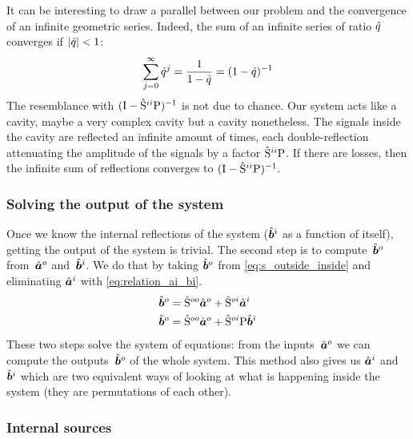 It can be interesting to draw a parallel between our problem and the convergence of an infinite geometric series.
Indeed, the sum of an infinite series of ratio $\hat{q}$ converges if $\abs{\cp{q}} < 1$:
\begin{equation}
    \sum_{j=0}^\infty \hat{q}^j = \frac{1}{1-\hat{q}} = (1-\hat{q})^{-1}
\end{equation}
The resemblance with $(\mathrm{I} - \hat{\mathrm{S}}^{ii}\mathrm{P})^{-1}$ is not due to chance.
Our system acts like a cavity, maybe a very complex cavity but a cavity nonetheless.
The signals inside the cavity are reflected an infinite amount of times, each double-reflection attenuating the amplitude of the signals by a factor $\hat{\mathrm{S}}^{ii}\mathrm{P}$.
If there are losses, then the infinite sum of reflections converges to $(\mathrm{I} - \hat{\mathrm{S}}^{ii}\mathrm{P})^{-1}$.




\subsubsection{Solving the output of the system}

Once we know the internal reflections of the system ($\hat{\bm{b}}^i$ as a function of itself), getting the output of the system is trivial.
The second step is to compute~$\hat{\bm{b}}^o$ from~$\hat{\bm{a}}^o$ and~$\hat{\bm{b}}^i$.
We do that by taking $\hat{\bm{b}}^o$ from \cref{eq:s_outside_inside} and eliminating $\hat{\bm{a}}^i$ with \cref{eq:relation_ai_bi}.
\begin{subequations}
\begin{align}
    \hat{\bm{b}}^o &= \hat{\mathrm{S}}^{oo}\hat{\bm{a}}^o + \hat{\mathrm{S}}^{oi}\hat{\bm{a}}^i \\
    \hat{\bm{b}}^o &= \hat{\mathrm{S}}^{oo}\hat{\bm{a}}^o + \hat{\mathrm{S}}^{oi}\mathrm{P}\hat{\bm{b}}^i \label{eq:compute_bo}
\end{align}
\end{subequations}
These two steps solve the system of equations: from the inputs~$\hat{\bm{a}}^o$ we can compute the outputs~$\hat{\bm{b}}^o$ of the whole system.
This method also gives us $\hat{\bm{a}}^i$ and $\hat{\bm{b}}^i$ which are two equivalent ways of looking at what is happening inside the system (they are permutations of each other).



\subsubsection{Internal sources}

